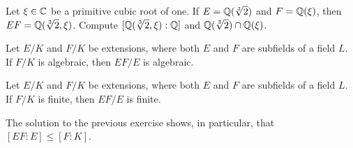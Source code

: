 \begin{exercise}
    Let $\xi\in\mathbb{C}$ be a primitive cubic root of one. 
    If $E=\mathbb{Q}(\sqrt[3]{2})$ and $F=\mathbb{Q}(\xi)$, then $EF=\mathbb{Q}(\sqrt[3]{2},\xi)$. 
    Compute $[\mathbb{Q}(\sqrt[3]{2},\xi):\mathbb{Q}]$ and 
    $\mathbb{Q}(\sqrt[3]{2})\cap\mathbb{Q}(\xi)$. 
\end{exercise}

\begin{exercise}
	Let $E/K$ and $F/K$ be extensions, where both $E$ and $F$ are subfields of 
	a field $L$. If $F/K$ is algebraic, then $EF/E$ is algebraic.
\end{exercise}


\begin{exercise}
	Let $E/K$ and $F/K$ be extensions, where both $E$ and $F$ are subfields of 
	a field $L$. If $F/K$ is finite, then $EF/E$ is finite.
\end{exercise}

The solution to the previous exercise shows, in particular, that $[EF:E]\leq [F:K]$. 
